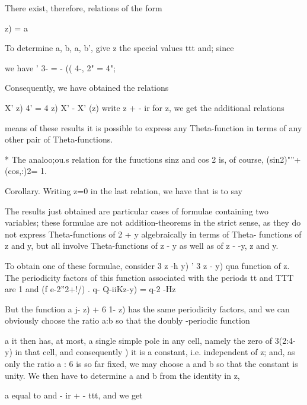 There exist, therefore, relations of the form

     z) = a%

To determine a, b, a, b', give z the special values ttt and; since

we have ' 3- = - (( 4-, 2" = 4"; %

Consequently, we have obtained the relations

X' z) 4' = 4 z) X' - X' (z) %
write z + - ir for z, we get the additional relations

means of these results it is possible to express any Theta-function in
terms of any other pair of Theta-functions.

* The analoo;ou.s relation for the fuuctions sinz and cos 2 is, of
course, (sin2)"''+(cos,:)2= 1.

%
%

Corollary. Writing z=0 in the last relation, we have that is to say


The results just obtained are particular cases of formulae containing
two variables; these formulae are not addition-theorems in the strict
sense, as they do not express Theta-functions of 2 + y algebraically
in terms of Theta- functions of z and y, but all involve
Theta-functions of z - y as well as of z - -y, z and y.

To obtain one of these formulae, consider 3 z -h y) ' 3 z - y) qua
function of z. The periodicity factors of this function associated
with the periods tt and TTT are 1 and (f e-2''2+!/) . q- Q-iiKz-y) =
q-2 -Hz

But the function a j- z) + 6 1- z) has the same periodicity factors,
and we can obviously choose the ratio a:b so that the doubly -periodic
function

a%
it then has, at most, a single simple pole in any cell, namely the
zero of 3(2:4- y) in that cell, and consequently ) it is a
constant, i.e. independent of z; and, as only the ratio a : 6 is so
far fixed, we may choose a and b so that the constant is unity. We
then have to determine a and b from the identity in z,

a%
equal to and - ir + - ttt, and we get

